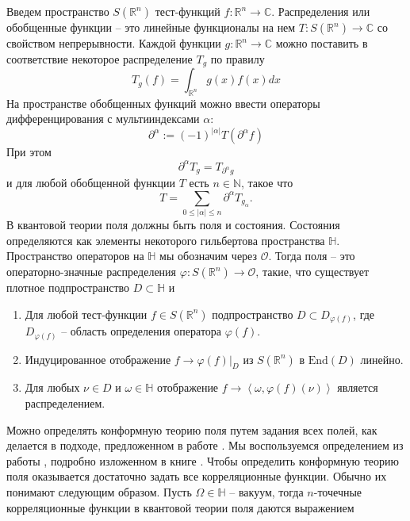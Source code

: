Введем пространство $S(\mathbb{R}^{n})$ тест-функций $f:\mathbb{R}^{n}\to \mathbb{C}$. Распределения или обобщенные функции -- это линейные функционалы на нем $T:S(\mathbb{R}^{n})\to \mathbb{C}$ со свойством непрерывности. Каждой функции $g:\mathbb{R}^{n}\to \mathbb{C}$ можно поставить в соответствие некоторое распределение $T_{g}$ по правилу
\begin{equation}
  \label{eq:30}
  T_{g}(f)=\int_{\mathbb{R}^{n}}g(x)f(x) dx
\end{equation}
На пространстве обобщенных функций можно ввести операторы дифференцирования с мультииндексами $\alpha$:
\begin{equation}
  \label{eq:41}
  \partial^{\alpha}:=(-1)^{|\alpha|}T(\partial^{\alpha} f)
\end{equation}
При этом
\begin{equation}
  \label{eq:42}
  \partial^{\alpha}T_{g}=T_{\partial ^{\alpha}g}
\end{equation}
и для любой обобщенной функции $T$ есть $n\in \mathbb{N}$, такое что
\begin{equation}
  \label{eq:49}
  T=\sum_{0\leq |\alpha|\leq n}\partial^{\alpha} T_{g_{\alpha}}.
\end{equation}
В квантовой теории поля должны быть поля и состояния. Состояния определяются как элементы некоторого гильбертова пространства $\mathbb{H}$. Пространство операторов на $\mathbb{H}$ мы обозначим через $\mathcal{O}$. Тогда поля -- это операторно-значные распределения $\varphi:S(\mathbb{R}^{n})\to \mathcal{O}$, такие, что существует плотное подпространство $D\subset \mathbb{H}$ и
\begin{enumerate}
\item Для любой тест-функции $f\in S(\mathbb{R}^{n})$ подпространство $D\subset D_{\varphi(f)}$, где $D_{\varphi(f)}$ -- область определения оператора $\varphi(f)$.
\item Индуцированное отображение $f\to \varphi(f)|_{D}$ из $S(\mathbb{R}^{n})$ в $\mathrm{End}(D)$ линейно.
\item Для любых $\nu\in D$ и $\omega\in \mathbb{H}$ отображение $f\to \left<\omega,\varphi(f)(\nu)\right>$ является распределением. 
\end{enumerate}
Можно определять конформную теорию поля путем задания всех полей, как делается в подходе, предложенном в работе \cite{moore1989classical}. Мы воспользуемся определением из работы \cite{felder1989structure}, подробно изложенном в книге \cite{schottenloher2008mathematical}. Чтобы определить конформную теорию поля оказывается достаточно задать все корреляционные функции. Обычно их понимают следующим образом.   Пусть $\Omega\in\mathbb{H}$ -- вакуум, тогда $n$-точечные корреляционные функции в квантовой теории поля даются выражением
